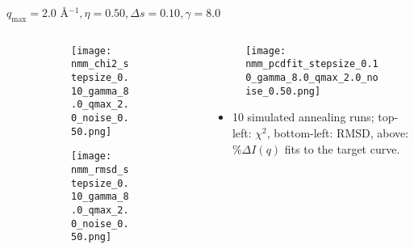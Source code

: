 \documentclass{beamer}
\begin{document}
\begin{frame}{$ q_{\textrm{max}}=2.0 $ \AA $^{-1}, \eta=0.50, \Delta s=0.10, \gamma=8.0$}
	\begin{columns}
		\begin{column}{.5\textwidth}
			\begin{figure}[H]
			\centering
			\begin{subfigure}[b]{\textwidth}
				\centering
				\texttt{[image: nmm\_chi2\_stepsize\_0.10\_gamma\_8.0\_qmax\_2.0\_noise\_0.50.png]}
				\label{fig:}
			\end{subfigure}
			\begin{subfigure}[b]{\textwidth}
				\centering
				\texttt{[image: nmm\_rmsd\_stepsize\_0.10\_gamma\_8.0\_qmax\_2.0\_noise\_0.50.png]}
				\label{fig:}
			\end{subfigure}
			\end{figure}
		\end{column}
		\begin{column}{.5\textwidth}
			\begin{figure}[H]
				\centering
				\texttt{[image: nmm\_pcdfit\_stepsize\_0.10\_gamma\_8.0\_qmax\_2.0\_noise\_0.50.png]}
				\label{fig:}
			\end{figure}
			\begin{itemize}
				\item 10 simulated annealing runs; top-left: $\chi^2$, bottom-left: RMSD, above: $\%\Delta I(q)$ fits to the target curve.
			\end{itemize}
		\end{column}
	\end{columns}
\end{frame}
 
\end{document}
